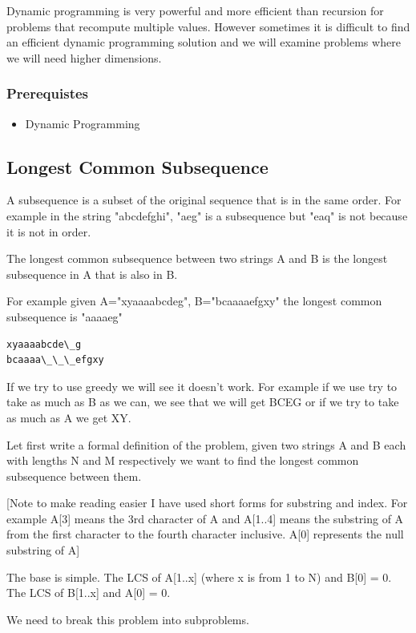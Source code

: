 \documentclass[11pt,oneside]{book}
\begin{document}
Dynamic programming is very powerful and more efficient than recursion for problems that recompute multiple values. However sometimes it is difficult to find an efficient dynamic programming solution and we will examine problems where we will need higher dimensions.

\subsubsection{Prerequistes}

\begin{itemize}
\item Dynamic Programming
\end{itemize}

\subsection{Longest Common Subsequence}

A subsequence is a subset of the original sequence that is in the same order. For example in the string "abcdefghi", "aeg" is a subsequence but "eaq" is not because it is not in order.

The longest common subsequence between two strings A and B is the longest subsequence in A that is also in B.

For example given A="xyaaaabcdeg", B="bcaaaaefgxy" the longest common subsequence is "aaaaeg"

\begin{lstlisting}
xyaaaabcde\_g
bcaaaa\_\_\_efgxy
\end{lstlisting}

If we try to use greedy we will see it doesn't work. For example if we use try to take as much as B as we can, we see that we will get BCEG or if we try to take as much as A we get XY.

Let first write a formal definition of the problem, given two strings A and B each with lengths N and M respectively we want to find the longest common subsequence between them.

[Note to make reading easier I have used short forms for substring and index. For example A[3] means the 3rd character of A and A[1..4] means the substring of A from the first character to the fourth character inclusive. A[0] represents the null substring of A]

The base is simple. The LCS of A[1..x] (where x is from 1 to N) and B[0] = 0. The LCS of B[1..x] and A[0] = 0.

We need to break this problem into subproblems.
\end{document}
